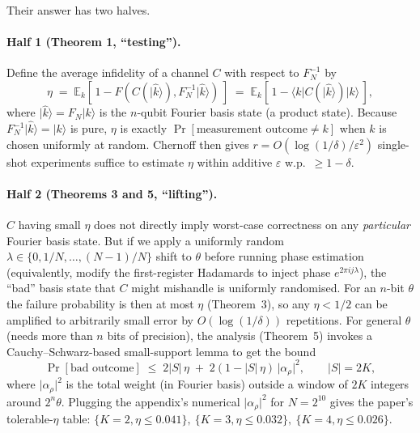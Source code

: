 \documentclass[11pt]{article}
\newcommand{\ket}[1]{\lvert #1 \rangle}
\newcommand{\bra}[1]{\langle #1 \rvert}
\begin{document}
Their answer has two halves.

\paragraph{Half 1 (Theorem 1, ``testing'').}
Define the average infidelity of a channel $C$ with respect to $F_N^{-1}$ by
\begin{equation}\label{eq:eta}
\eta \;=\; \mathbb{E}_k\!\left[\, 1 - F\!\left(C(\ket{\hat k}), F_N^{-1}\ket{\hat k}\right)\,\right]
    \;=\; \mathbb{E}_k\!\left[\, 1 - \bra{k} C(\ket{\hat k}) \ket{k}\,\right],
\end{equation}
where $\ket{\hat k} = F_N \ket{k}$ is the $n$-qubit Fourier basis state
(a product state).  Because $F_N^{-1} \ket{\hat k} = \ket{k}$ is pure,
$\eta$ is exactly $\Pr[\text{measurement outcome} \neq k]$
when $k$ is chosen uniformly at random.  Chernoff then gives
$r = O(\log(1/\delta)/\varepsilon^2)$ single-shot experiments suffice to
estimate $\eta$ within additive $\varepsilon$ w.p.\ $\geq 1-\delta$.

\paragraph{Half 2 (Theorems 3 and 5, ``lifting'').}
$C$ having small $\eta$ does not directly imply worst-case correctness on
any \emph{particular} Fourier basis state.  But if we apply a uniformly
random $\lambda \in \{0, 1/N, \ldots, (N-1)/N\}$ shift to $\theta$ before
running phase estimation (equivalently, modify the first-register
Hadamards to inject phase $e^{2\pi i j\lambda}$), the ``bad'' basis state
that $C$ might mishandle is uniformly randomised.  For an $n$-bit
$\theta$ the failure probability is then at most $\eta$
(Theorem~3), so any $\eta < 1/2$ can be amplified to arbitrarily small
error by $O(\log(1/\delta))$ repetitions.  For general $\theta$ (needs
more than $n$ bits of precision), the analysis (Theorem~5) invokes a
Cauchy--Schwarz-based small-support lemma to get the bound
\begin{equation}\label{eq:t5bound}
\Pr[\text{bad outcome}] \;\leq\; 2\lvert S\rvert\,\eta \;+\; 2(1-\lvert S\rvert\,\eta)\,\lvert\alpha_\rho\rvert^2,
\qquad \lvert S\rvert = 2K,
\end{equation}
where $\lvert\alpha_\rho\rvert^2$ is the total weight (in Fourier basis)
outside a window of $2K$ integers around $2^n\theta$.  Plugging the
appendix's numerical $\lvert\alpha_\rho\rvert^2$ for $N=2^{10}$ gives the
paper's tolerable-$\eta$ table:
$\{K=2, \eta\leq 0.041\},\ \{K=3, \eta\leq 0.032\},\ \{K=4, \eta\leq 0.026\}$.
\end{document}
